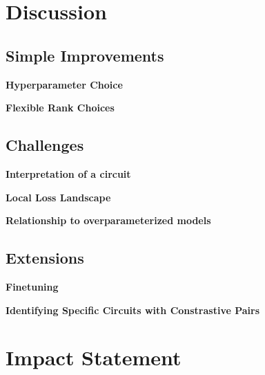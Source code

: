 \documentclass{article}
\theoremstyle{plain}
\theoremstyle{definition}
\theoremstyle{remark}
\begin{document}
\section{Discussion}

\subsection{Simple Improvements}

\textbf{Hyperparameter Choice}

\textbf{Flexible Rank Choices}

\subsection{Challenges}

\textbf{Interpretation of a circuit}

\textbf{Local Loss Landscape}

\textbf{Relationship to overparameterized models}

\subsection{Extensions}

\textbf{Finetuning}

\textbf{Identifying Specific Circuits with Constrastive Pairs}


\clearpage

\section{Impact Statement}



\clearpage




\newpage
\appendix
\renewcommand{\thefigure}{S\arabic{figure}}  %
\renewcommand{\theHfigure}{S\arabic{figure}} %
\setcounter{figure}{0}  %
\onecolumn
\end{document}
